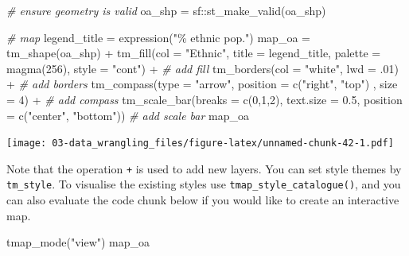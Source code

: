 \documentclass[
]{book}
\newenvironment{Shaded}{\begin{snugshade}}{\end{snugshade}}
\newcommand{\AttributeTok}[1]{\textcolor[rgb]{0.77,0.63,0.00}{#1}}
\newcommand{\CommentTok}[1]{\textcolor[rgb]{0.56,0.35,0.01}{\textit{#1}}}
\newcommand{\DecValTok}[1]{\textcolor[rgb]{0.00,0.00,0.81}{#1}}
\newcommand{\FloatTok}[1]{\textcolor[rgb]{0.00,0.00,0.81}{#1}}
\newcommand{\FunctionTok}[1]{\textcolor[rgb]{0.00,0.00,0.00}{#1}}
\newcommand{\NormalTok}[1]{#1}
\newcommand{\OtherTok}[1]{\textcolor[rgb]{0.56,0.35,0.01}{#1}}
\newcommand{\SpecialCharTok}[1]{\textcolor[rgb]{0.00,0.00,0.00}{#1}}
\newcommand{\StringTok}[1]{\textcolor[rgb]{0.31,0.60,0.02}{#1}}
\begin{document}
\begin{Shaded}
\begin{Highlighting}[]
\CommentTok{\# ensure geometry is valid}
\NormalTok{oa\_shp }\OtherTok{=}\NormalTok{ sf}\SpecialCharTok{::}\FunctionTok{st\_make\_valid}\NormalTok{(oa\_shp)}

\CommentTok{\# map}
\NormalTok{legend\_title }\OtherTok{=} \FunctionTok{expression}\NormalTok{(}\StringTok{"\% ethnic pop."}\NormalTok{)}
\NormalTok{map\_oa }\OtherTok{=} \FunctionTok{tm\_shape}\NormalTok{(oa\_shp) }\SpecialCharTok{+}
  \FunctionTok{tm\_fill}\NormalTok{(}\AttributeTok{col =} \StringTok{"Ethnic"}\NormalTok{, }\AttributeTok{title =}\NormalTok{ legend\_title, }\AttributeTok{palette =} \FunctionTok{magma}\NormalTok{(}\DecValTok{256}\NormalTok{), }\AttributeTok{style =} \StringTok{"cont"}\NormalTok{) }\SpecialCharTok{+} \CommentTok{\# add fill}
  \FunctionTok{tm\_borders}\NormalTok{(}\AttributeTok{col =} \StringTok{"white"}\NormalTok{, }\AttributeTok{lwd =}\NormalTok{ .}\DecValTok{01}\NormalTok{)  }\SpecialCharTok{+} \CommentTok{\# add borders}
  \FunctionTok{tm\_compass}\NormalTok{(}\AttributeTok{type =} \StringTok{"arrow"}\NormalTok{, }\AttributeTok{position =} \FunctionTok{c}\NormalTok{(}\StringTok{"right"}\NormalTok{, }\StringTok{"top"}\NormalTok{) , }\AttributeTok{size =} \DecValTok{4}\NormalTok{) }\SpecialCharTok{+} \CommentTok{\# add compass}
  \FunctionTok{tm\_scale\_bar}\NormalTok{(}\AttributeTok{breaks =} \FunctionTok{c}\NormalTok{(}\DecValTok{0}\NormalTok{,}\DecValTok{1}\NormalTok{,}\DecValTok{2}\NormalTok{), }\AttributeTok{text.size =} \FloatTok{0.5}\NormalTok{, }\AttributeTok{position =}  \FunctionTok{c}\NormalTok{(}\StringTok{"center"}\NormalTok{, }\StringTok{"bottom"}\NormalTok{)) }\CommentTok{\# add scale bar}
\NormalTok{map\_oa}
\end{Highlighting}
\end{Shaded}

\texttt{[image: 03-data\_wrangling\_files/figure-latex/unnamed-chunk-42-1.pdf]}

Note that the operation \texttt{+} is used to add new layers. You can set style themes by \texttt{tm\_style}. To visualise the existing styles use \texttt{tmap\_style\_catalogue()}, and you can also evaluate the code chunk below if you would like to create an interactive map.

\begin{Shaded}
\begin{Highlighting}[]
\FunctionTok{tmap\_mode}\NormalTok{(}\StringTok{"view"}\NormalTok{)}
\NormalTok{map\_oa}
\end{Highlighting}
\end{Shaded}
\end{document}
